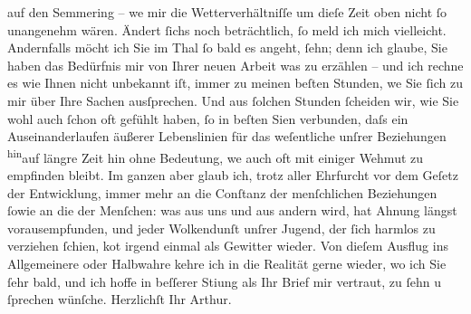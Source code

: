 \begin{ledgroupsized}[t]{13cm}
               auf den Semmering – we{\geminationn}
               mir die Wetterverhältniſſe um dieſe Zeit oben nicht ſo unangenehm wären. Ändert ſichs
               noch beträchtlich, ſo meld ich mich vielleicht. Andernfalls möcht ich Sie im Thal ſo
               bald es angeht, ſehn; denn ich glaube, {\pb}Sie haben das
               Bedürfnis mir von Ihrer neuen Arbeit was zu erzählen – und ich rechne es wie Ihnen nicht unbekannt iſt,
               immer zu meinen beſten Stunden, we{\geminationn} Sie ſich zu mir über
               Ihre Sachen ausſprechen. Und aus ſolchen Stunden ſcheiden wir, wie Sie wohl auch
               ſchon oft gefühlt haben, ſo in beſten Si{\geminationn}en verbunden,
               daſs ein Auseinanderlaufen äußerer Lebenslinien für das weſentliche unſrer
               Beziehungen \substVorne{}\textsuperscript{hin}\substDazwischen{}auf\substHinten{} längre Zeit \introOben{}hin\introOben{} ohne Bedeutung, we{\geminationn} auch oft mit einiger Wehmut zu empfinden bleibt. Im
               ganzen aber glaub ich, trotz aller Ehrfurcht vor dem Geſetz der Entwicklung, immer
               mehr an die Conſtanz der \introOben{}menſchlichen\introOben{} Beziehungen \introOben{}ſo\introOben{}wie an die der Menſchen: was aus uns und aus andern wird,
               hat Ahnung längst vorausempfunden, und jeder Wolkendunſt unſrer Jugend, der ſich
               harmlos zu verziehen ſchien, ko{\geminationm}t irgend einmal als
               Gewitter wieder. Von dieſem Ausflug ins Allgemeinere oder Halbwahre kehre ich in die
               Realität gerne wieder, wo ich Sie ſehr bald, und ich hoffe in beſſerer Sti{\geminationm}ung als Ihr Brief mir vertraut, zu ſehn u ſprechen
               wünſche.\pend
           \pstart Herzlichſt Ihr \spacefill\mbox{Arthur.}\pend{}\endnumbering{}\end{ledgroupsized}  \newcommand{\dateiname}{L02168}\newcommand{\titel}{Arthur Schnitzler an Hugo von Hofmannsthal, 28. 3. 1914}\newcommand{\editorInnen}{Martin Anton Müller und Gerd-Hermann Susen}
      